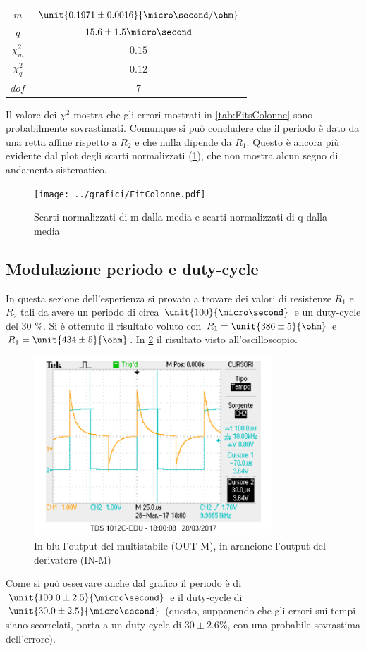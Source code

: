 \documentclass[a4paper,10pt]{article}
\begin{document}
\begin{table}[H]
\centering
\begin{tabular}{c|c} 
$m$ & $\unit{0.1971 \pm 0.0016}{\micro\second/\ohm} $\\
$q$ & ${15.6 \pm 1.5}{\micro\second}$\\
$\chi^2_m$ & $0.15$\\
$\chi^2_q$ & $0.12$\\
$dof$ & $7$\\
\end{tabular}
\end{table}



Il valore dei $\chi^2$ mostra che gli errori mostrati in \cref{tab:FitsColonne} sono probabilmente sovrastimati. Comunque si può concludere che il periodo è dato da una retta affine rispetto a $R_2$ e che nulla dipende da $R_1$. Questo è ancora più evidente dal plot degli scarti normalizzati (\cref{fig:FitColonne}), che non mostra alcun segno di andamento sistematico.

 
\begin{figure}[H]
	\centering
	\texttt{[image: ../grafici/FitColonne.pdf]}
	\caption{Scarti normalizzati di m dalla media e scarti normalizzati di q dalla media}
	\label{fig:FitColonne}
\end{figure}

\subsection{Modulazione periodo e duty-cycle}

In questa sezione dell'esperienza si provato a trovare dei valori di resistenze $R_1$ e $R_2$ tali da avere un periodo di circa $\unit{100}{\micro\second}$ e un duty-cycle del 30 \%. Si è ottenuto il risultato voluto con $R_1=\unit{386 \pm 5}{\ohm}$ e  $R_1=\unit{434 \pm 5}{\ohm}$. In \cref{fig:410030} il risultato visto all'oscilloscopio. 


 \begin{figure}[H]
	\centering
	\includegraphics[width=0.8\textwidth]{../grafici/410030.png}
	\caption{In blu l'output del multistabile (OUT-M), in arancione l'output del derivatore (IN-M)}
	\label{fig:410030}
\end{figure}

Come si può osservare anche dal grafico il periodo è di $\unit{100.0 \pm 2.5}{\micro\second}$ e il duty-cycle di $\unit{30.0 \pm 2.5}{\micro\second}$ (questo, supponendo che gli errori sui tempi siano scorrelati, porta a un duty-cycle di $30 \pm 2.6 \% $, con una probabile sovrastima dell'errore).
\end{document}
